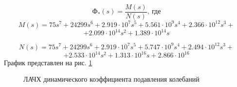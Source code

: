 \documentclass[main.tex]{subfiles}
\begin{document}
 \[ \text{Ф}_*(s) =  \frac{M(s)}{N(s)},\ \text{где}\]
\[ M(s) = 75s^7 + 24299s^6 + 2.919 \cdot 10^{7} s^5 + 5.561 \cdot 10^{9} s^4 + 2.366 \cdot 10^{12} s^3 + \]\[+2.099 \cdot 10^{14} s^2 + 1.389 \cdot 10^{14} s \]

\[ N(s) = 75s^7 + 24299s^6 + 2.919 \cdot 10^{7} s^5 + 5.747 \cdot 10^{9} s^4 + 2.494 \cdot 10^{12} s^3 +\]\[
+ 2.533 \cdot 10^{14} s^2 + 1.313 \cdot 10^{16} s + 2.866 \cdot 10^{16} \] 
График представлен на рис. \ref{fig:p9_dyn_k}
\begin{figure}[h]
    \caption{ЛАЧХ динамического коэффициента подавления колебаний}
    \label{fig:p9_dyn_k}
\end{figure}
\end{document}
